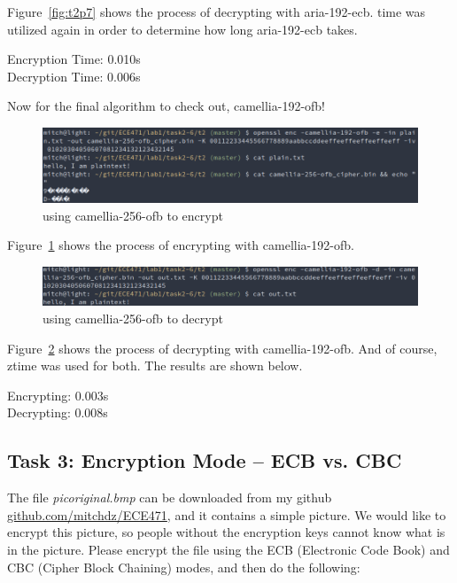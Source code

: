 \documentclass[12pt]{article}
\begin{document}
Figure~\ref{fig:t2p7} shows the process of decrypting with aria-192-ecb. time was utilized again in
order to  determine how long aria-192-ecb takes.

Encryption Time: 0.010s \\
Decryption Time: 0.006s


Now for the final algorithm to check out, camellia-192-ofb!

\begin{figure}[H]
    \begin{center}
        \includegraphics[scale=0.48]{t2p8.png}
    \end{center}{}
    \caption{using camellia-256-ofb to encrypt}
    \label{fig:t2p8}
\end{figure}

Figure~\ref{fig:t2p8} shows the process of encrypting with camellia-192-ofb.

\begin{figure}[H]
    \begin{center}
        \includegraphics[scale=0.48]{t2p9.png}
    \end{center}{}
    \caption{using camellia-256-ofb to decrypt}
    \label{fig:t2p9}
\end{figure}

Figure~\ref{fig:t2p9} shows the process of decrypting with camellia-192-ofb. And of course, 
ztime was used for both. The results are shown below.

Encrypting: 0.003s\\
Decrypting: 0.008s

\clearpage
\subsection{Task 3: Encryption Mode – ECB vs. CBC}


The file \emph{pic\textunderscore{}original.bmp} can be downloaded from my github
\url{github.com/mitchdz/ECE471}, 
and it contains a simple picture. We would like to encrypt this picture, so people without the
encryption keys cannot
know what is in the picture. Please encrypt the file using the ECB (Electronic Code Book) and CBC 
(Cipher Block Chaining) modes, and then do the following:
\end{document}
